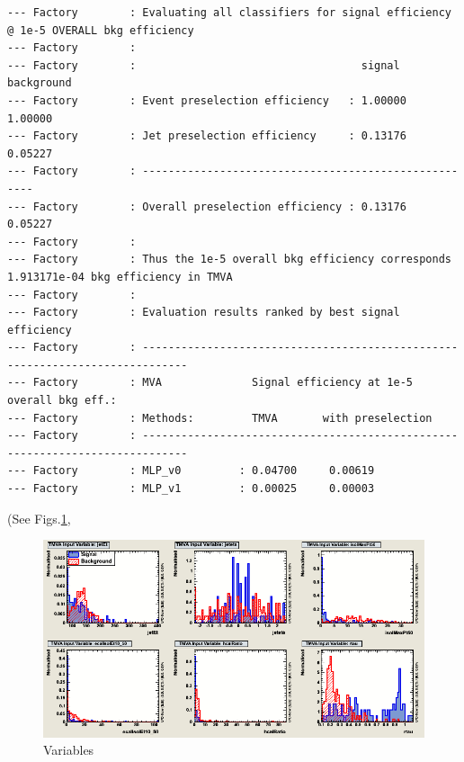 \begin{verbatim}
--- Factory        : Evaluating all classifiers for signal efficiency @ 1e-5 OVERALL bkg efficiency
--- Factory        : 
--- Factory        :                                   signal   background
--- Factory        : Event preselection efficiency   : 1.00000  1.00000
--- Factory        : Jet preselection efficiency     : 0.13176  0.05227
--- Factory        : -----------------------------------------------------
--- Factory        : Overall preselection efficiency : 0.13176  0.05227
--- Factory        : 
--- Factory        : Thus the 1e-5 overall bkg efficiency corresponds 1.913171e-04 bkg efficiency in TMVA
--- Factory        : 
--- Factory        : Evaluation results ranked by best signal efficiency
--- Factory        : -----------------------------------------------------------------------------
--- Factory        : MVA              Signal efficiency at 1e-5 overall bkg eff.:
--- Factory        : Methods:         TMVA       with preselection
--- Factory        : -----------------------------------------------------------------------------
--- Factory        : MLP_v0         : 0.04700     0.00619
--- Factory        : MLP_v1         : 0.00025     0.00003

\end{verbatim}
\normalsize

(See Figs.\ref{fig:variables_c1},
 
\begin{figure}[h]
\begin{center}
\includegraphics[width=1.0\textwidth]{images/ahVariables_c1.png}
\caption{Variables}
\label{fig:variables_c1}
\end{center}
\end{figure}


